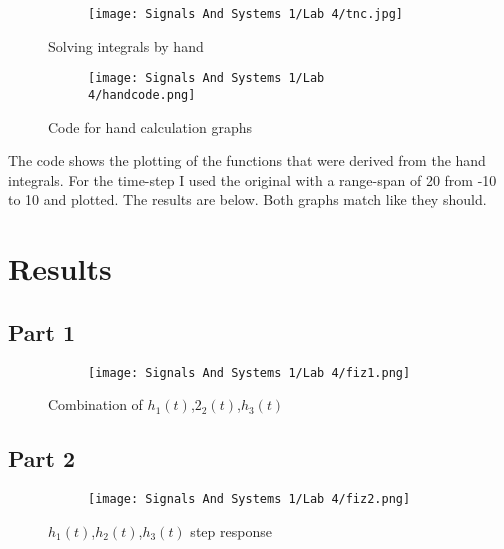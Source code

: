 \documentclass[12pt,a4paper]{article}
\begin{document}
\begin{figure}[h]
\centering
\begin{subfigure}{ 1\textwidth}
\texttt{[image: Signals And Systems 1/Lab 4/tnc.jpg]}
\end{subfigure}
\caption{ Solving integrals by hand}
\label{fig2:image22}
\end{figure}


\clearpage

\begin{figure}[h]
\centering
\begin{subfigure}{ 1\textwidth}
\texttt{[image: Signals And Systems 1/Lab 4/handcode.png]}
\end{subfigure}
\caption{ Code for hand calculation graphs}
\label{fig2:image22}
\end{figure}
The code shows the plotting of the functions that were derived from the hand integrals. For the time-step I used the original with a range-span of 20 from -10 to 10 and plotted. The results are below. Both graphs match like they should.
\clearpage

\section{Results}\label{sec:res}

\subsection{Part 1}

\begin{figure}[h]
\centering
\begin{subfigure}{ 1\textwidth}
\texttt{[image: Signals And Systems 1/Lab 4/fiz1.png]}
\end{subfigure}
\caption{ Combination of $h_1(t)$,$2_2(t)$,$h_3(t)$}
\label{fig2:image22}
\end{figure}



\subsection{Part 2}

\begin{figure}[h]
\centering
\begin{subfigure}{ 1\textwidth}
\texttt{[image: Signals And Systems 1/Lab 4/fiz2.png]}
\end{subfigure}
\caption{  $h_1(t)$,$h_2(t)$,$h_3(t)$ step response }
\label{fig2:image22}
\end{figure}
\end{document}
